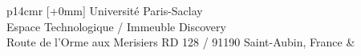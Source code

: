 \vspace{4cm} %
\selectfont
\begin{tabular}{p{14cm}r}
[+0mm]{{\color{Prune} Université Paris-Saclay\\
Espace Technologique / Immeuble Discovery\\
Route de l’Orme aux Merisiers RD 128 / 91190 Saint-Aubin, France}} & \\
\end{tabular}
